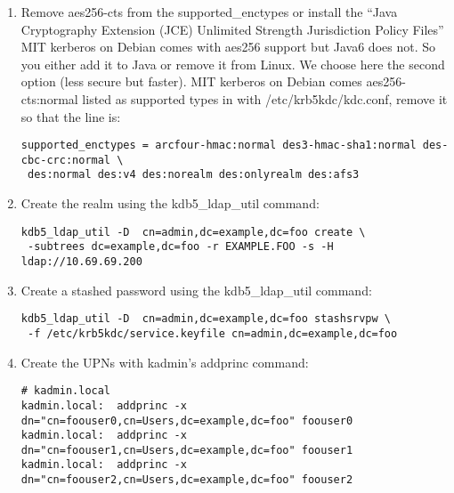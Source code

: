 \documentclass[12pt,a4]{article}
\begin{document}
\begin{enumerate}
\begin{verbatim}
[domain_realm]
	.example.foo = EXAMPLE.FOO

[login]
	krb4_convert = true
	krb4_get_tickets = false

[dbdefaults]
        ldap_kerberos_container_dn = dc=example,dc=foo

[dbmodules]
        openldap_ldapconf = {
                db_library = kldap
                ldap_kdc_dn = "cn=admin,dc=example,dc=foo"
                ldap_kadmind_dn = "cn=admin,dc=example,dc=foo"
                ldap_servers = ldap:/// 
                ldap_conns_per_server = 5
        }
\end{verbatim}

\item Remove aes256-cts from the supported\_enctypes or install the ``Java Cryptography Extension (JCE) Unlimited Strength Jurisdiction Policy Files''
MIT kerberos on Debian comes with aes256 support but Java6 does not. So you either add it to Java or remove it from Linux. We choose here the second option (less secure but faster). MIT kerberos on Debian comes aes256-cts:normal listed as supported types in with /etc/krb5kdc/kdc.conf, remove it so that the line is:

\begin{verbatim}
supported_enctypes = arcfour-hmac:normal des3-hmac-sha1:normal des-cbc-crc:normal \
 des:normal des:v4 des:norealm des:onlyrealm des:afs3
\end{verbatim}

\item Create the realm using the kdb5\_ldap\_util command:

\begin{verbatim}
kdb5_ldap_util -D  cn=admin,dc=example,dc=foo create \
 -subtrees dc=example,dc=foo -r EXAMPLE.FOO -s -H ldap://10.69.69.200
\end{verbatim}

\item Create a stashed password using the kdb5\_ldap\_util command:
\begin{verbatim}
kdb5_ldap_util -D  cn=admin,dc=example,dc=foo stashsrvpw \
 -f /etc/krb5kdc/service.keyfile cn=admin,dc=example,dc=foo
\end{verbatim}
\item Create the UPNs with kadmin's  addprinc command: 

\begin{verbatim}
# kadmin.local
kadmin.local:  addprinc -x dn="cn=foouser0,cn=Users,dc=example,dc=foo" foouser0
kadmin.local:  addprinc -x dn="cn=foouser1,cn=Users,dc=example,dc=foo" foouser1
kadmin.local:  addprinc -x dn="cn=foouser2,cn=Users,dc=example,dc=foo" foouser2
\end{verbatim}


\end{enumerate}
\end{document}
